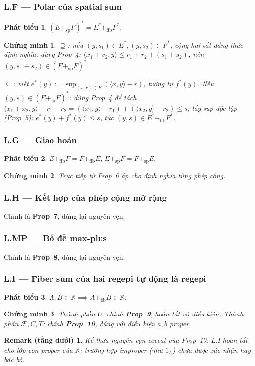 \documentclass[11pt]{article}
\theoremstyle{plainlabel}
\newtheorem*{phatbieu}{Phát biểu}
\newtheorem*{chungminh}{Chứng minh}
\newtheorem*{remarkbox}{Remark (tầng dưới)}
\begin{document}
\subsubsection*{L.F --- Polar của spatial sum}
\begin{phatbieu} $(E+_{\mathrm{sp}}F)^*=E^*+_{\mathrm{fib}}F^*$. \end{phatbieu}
\begin{chungminh}
$\supseteq$: nếu $(y,s_1)\in E^*,(y,s_2)\in F^*$, cộng hai bất đẳng thức định nghĩa, dùng Prop~4: $\langle x_1+x_2,y\rangle\le r_1+r_2+(s_1+s_2)$, nên $(y,s_1+s_2)\in(E+_{\mathrm{sp}}F)^*$.

$\subseteq$: viết $e^*(y):=\sup_{(x,r)\in E}(\langle x,y\rangle-r)$, tương tự $f^*(y)$. Nếu $(y,s)\in(E+_{\mathrm{sp}}F)^*$: dùng Prop~4 để tách $\langle x_1+x_2,y\rangle-r_1-r_2=(\langle x_1,y\rangle-r_1)+(\langle x_2,y\rangle-r_2)\le s$; lấy sup độc lập (Prop~5): $e^*(y)+f^*(y)\le s$, tức $(y,s)\in E^*+_{\mathrm{fib}}F^*$.
\end{chungminh}

\subsubsection*{L.G --- Giao hoán}
\begin{phatbieu} $E+_{\mathrm{fib}}F=F+_{\mathrm{fib}}E$, $E+_{\mathrm{sp}}F=F+_{\mathrm{sp}}E$. \end{phatbieu}
\begin{chungminh} Trực tiếp từ Prop~6 áp cho định nghĩa từng phép cộng. \end{chungminh}

\subsubsection*{L.H --- Kết hợp của phép cộng mở rộng}
Chính là \textbf{Prop~7}, dùng lại nguyên vẹn.

\subsubsection*{L.MP --- Bổ đề max-plus}
Chính là \textbf{Prop~8}, dùng lại nguyên vẹn.

\subsubsection*{L.I --- Fiber sum của hai regepi tự động là regepi}
\begin{phatbieu} $A,B\in\mathbb X\implies A+_{\mathrm{fib}}B\in\mathbb X$. \end{phatbieu}
\begin{chungminh} Thành phần $U$: chính \textbf{Prop~9}, hoàn tất vô điều kiện. Thành phần $\mathcal F,C,T$: chính \textbf{Prop~10}, đúng với điều kiện $a,b$ proper. \end{chungminh}
\begin{remarkbox}
Kế thừa nguyên vẹn caveat của Prop~10: L.I hoàn tất cho lớp con proper của $\mathbb X$; trường hợp improper (như $1_\wedge$) chưa được xác nhận hay bác bỏ.
\end{remarkbox}
\end{document}
